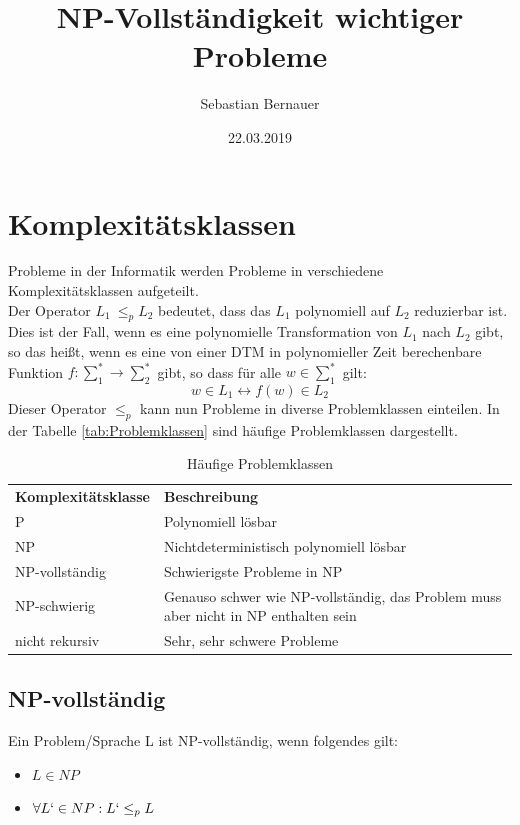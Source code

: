 \documentclass[ngerman]{article}
\author{Sebastian Bernauer}
\title{NP-Vollständigkeit wichtiger Probleme}
\date{22.03.2019}
\begin{document}
\maketitle
\tableofcontents
\newpage

\listoffigures
\listoftables
\newpage

\section{Komplexitätsklassen}
Probleme in der Informatik werden Probleme in verschiedene Komplexitätsklassen aufgeteilt.\\
Der Operator $L_1\ \le_p L_2$ bedeutet, dass das $L_1$ polynomiell auf $L_2$ reduzierbar ist.
Dies ist der Fall, wenn es eine polynomielle Transformation von $L_1$ nach $L_2$ gibt, so das heißt, wenn es eine von einer DTM in polynomieller Zeit berechenbare Funktion $f: \sum_1^* \rightarrow \sum_2^*$ gibt, so dass für alle $w \in \sum_1^*$ gilt:
$$w \in L_1 \leftrightarrow f(w) \in L_2$$
Dieser Operator $\le_p$ kann nun Probleme in diverse Problemklassen einteilen.
In der Tabelle \vref{tab:Problemklassen} sind häufige Problemklassen dargestellt.

\begin{table}[H]
	\centering
	\begin{tabular}{ | p{} | p{} | }
		\hline \rowcolor{gray!15}
		\textbf{Komplexitätsklasse} & \textbf{Beschreibung} \\ \hhline{|=|=|}
		P & Polynomiell lösbar \\ \hline
		NP & Nichtdeterministisch polynomiell lösbar \\ \hline
		NP-vollständig & Schwierigste Probleme in NP \\ \hline
		NP-schwierig & Genauso schwer wie NP-vollständig, das Problem muss aber nicht in NP enthalten sein\\ \hline
		nicht rekursiv & Sehr, sehr schwere Probleme\\ \hline	
	\end{tabular}
	\caption{Häufige Problemklassen}
	\label{tab:Problemklassen}
\end{table}

\subsection{NP-vollständig}
Ein Problem/Sprache L ist NP-vollständig, wenn folgendes gilt:\\
\begin{itemize}
\item $L \in NP$
\item $\forall L` \in NP: L` \leq_p L$
\end{itemize}
\end{document}

